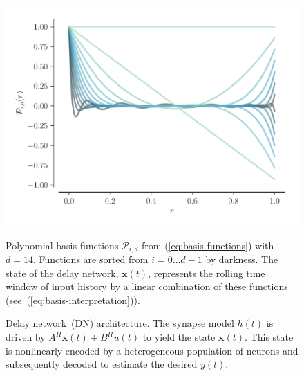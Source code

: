 \documentclass[12pt, a4paper]{article}
\renewcommand{\vec}{\mathbf}  %
\begin{document}
\begin{figure}
\centering
\begin{minipage}[b]{.32\textwidth}
  \includegraphics[width=\linewidth]{basis.pdf}
  \caption{ \label{fig:basis}
    Polynomial basis functions $\mathcal{P}_{i, d}$ from (\ref{eq:basis-functions}) with $d = 14$.
    Functions are sorted from $i = 0 \ldots d - 1$ by darkness.
    The state of the delay network, $\vec{x}(t)$, represents the rolling time window of input history by a linear combination of these functions (see~(\ref{eq:basis-interpretation})).
  } 
\end{minipage}\hfill
\begin{minipage}[b]{.32\textwidth}
  \caption{ \label{fig:architecture}
    Delay network~(DN) architecture.
    The synapse model $h(t)$ is driven by $A^H \vec{x}(t) + B^H u(t)$ to yield the state $\vec{x}(t)$. 
    This state is nonlinearly encoded by a heterogeneous population of neurons and subsequently decoded to estimate the desired $y(t)$.
  } 
\end{minipage}\hfill

\end{figure}
\end{document}
